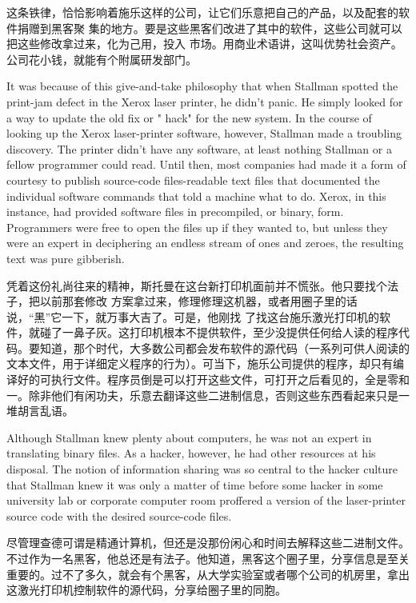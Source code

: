 \ifdefined\chs
这条铁律，恰恰影响着施乐这样的公司，让它们乐意把自己的产品，以及配套的软件捐赠到黑客聚
集的地方。要是这些黑客们改进了其中的软件，这些公司就可以把这些修改拿过来，化为己用，投入
市场。用商业术语讲，这叫优势社会资产。公司花小钱，就能有个附属研发部门。
\fi

\ifdefined\eng
It was because of this give-and-take philosophy that when Stallman spotted the print-jam defect in the Xerox laser printer, he didn't panic. He simply looked for a way to update the old fix or " hack" for the new system. In the course of looking up the Xerox laser-printer software, however, Stallman made a troubling discovery. The printer didn't have any software, at least nothing Stallman or a fellow programmer could read. Until then, most companies had made it a form of courtesy to publish source-code files-readable text files that documented the individual software commands that told a machine what to do. Xerox, in this instance, had provided software files in precompiled, or binary, form. Programmers were free to open the files up if they wanted to, but unless they were an expert in deciphering an endless stream of ones and zeroes, the resulting text was pure gibberish.
\fi

\ifdefined\chs
凭着这份礼尚往来的精神，斯托曼在这台新打印机面前并不慌张。他只要找个法子，把以前那套修改
方案拿过来，修理修理这机器，或者用圈子里的话说，``黑''它一下，就万事大吉了。可是，他刚找
了找这台施乐激光打印机的软件，就碰了一鼻子灰。这打印机根本不提供软件，至少没提供任何给人读的程序代码。要知道，那个时代，大多数公司都会发布软件的源代码（一系列可供人阅读的文本文件，用于详细定义程序的行为）。可当下，施乐公司提供的程序，却只有编译好的可执行文件。程序员倒是可以打开这些文件，可打开之后看见的，全是零和一。除非他们有闲功夫，乐意去翻译这些二进制信息，否则这些东西看起来只是一堆胡言乱语。
\fi


\ifdefined\eng
Although Stallman knew plenty about computers, he was not an expert in translating binary files. As a hacker, however, he had other resources at his disposal. The notion of information sharing was so central to the hacker culture that Stallman knew it was only a matter of time before some hacker in some university lab or corporate computer room proffered a version of the laser-printer source code with the desired source-code files.
\fi

\ifdefined\chs
尽管理查德可谓是精通计算机，但还是没那份闲心和时间去解释这些二进制文件。不过作为一名黑客，他总还是有法子。他知道，黑客这个圈子里，分享信息是至关重要的。过不了多久，就会有个黑客，从大学实验室或者哪个公司的机房里，拿出这激光打印机控制软件的源代码，分享给圈子里的同胞。
\fi

